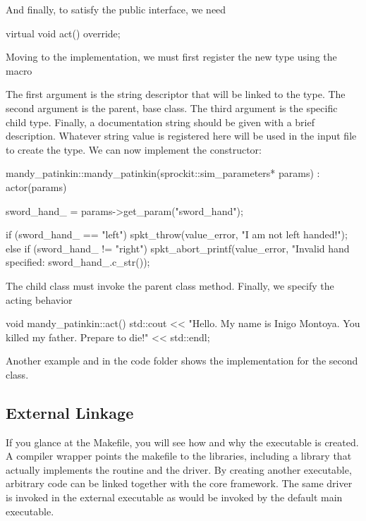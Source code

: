 And finally, to satisfy the  public interface, we need

\begin{CppCode}
virtual void
act() override;
\end{CppCode}

Moving to the implementation, we must first register the new type using the macro

\begin{CppCode}
namespace sstmac {
    namespace tutorial {

SpktRegister("patinkin", actor, mandy_patinkin,
    "He's on one of those shows now... NCIS? CSI?");
\end{CppCode}
The first argument is the string descriptor that will be linked to the type.
The second argument is the parent, base class. 
The third argument is the specific child type.
Finally, a documentation string should be given with a brief description.
Whatever string value is registered here will be used in the input file to create the type.
We can now implement the constructor:

\begin{CppCode}
mandy_patinkin::mandy_patinkin(sprockit::sim_parameters* params) :
  actor(params)
{
  sword_hand_ = params->get_param("sword_hand");

  if (sword_hand_ == "left"){
    spkt_throw(value_error, "I am not left handed!");
  }
  else if (sword_hand_ != "right"){
      spkt_abort_printf(value_error,
          "Invalid hand specified: %
          sword_hand_.c_str());
  }
}
\end{CppCode}
The child class must invoke the parent class method. 
Finally, we specify the acting behavior

\begin{CppCode}
void
mandy_patinkin::act()
{
    std::cout << "Hello. My name is Inigo Montoya. You killed my father. Prepare to die!"
              << std::endl;
}
\end{CppCode}

Another example  and  in the code folder shows the implementation for the second class.

\subsection{External Linkage}\label{subsec:linkage}
If you glance at the Makefile, you will see how and why the executable is created.
A compiler wrapper  points the makefile to the \sstmacro libraries, including a library  that actually implements the  routine and the \sstmacro driver.
By creating another executable, arbitrary code can be linked together with the core \sstmacro framework.
The same \sstmacro driver is invoked in the external executable as would be invoked by the default main executable.

